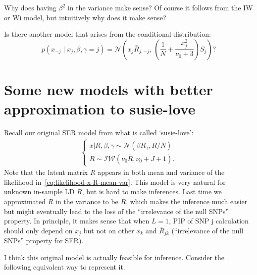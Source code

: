 \documentclass[11pt]{article}
\newcommand{\Normal}{\mathcal N}
\begin{document}
Why does having $\beta^2$ in the variance make sense? Of course it follows from the IW or Wi model, but intuitively why does it make sense?

Is there another model that arises from the conditional distribution:
\begin{equation}\label{eq:conditional-dist-Matthew}
p(x_{-j}\mid x_j, \beta, \gamma=j) = 
\Normal\left(
x_j \bar R_{j, -j} ,\,
\left(\frac{1}{N}+ \dfrac{x_j^2}{\nu_0 + 3}\right)S_j
\right)?
\end{equation}

\section{Some new models with better approximation to susie-love}
Recall our original SER model from what is called `susie-love':
\begin{align}\label{eq:likelihood-x-R-mean-var} 
\begin{cases}
x | R, \beta, \gamma \sim \mathcal{N}(\beta R_{\gamma}, R / N)\\
R \sim \mathcal{IW}(\nu_0 \bar R, \nu_0 + J + 1).
\end{cases}
\end{align}
Note that the latent matrix $R$ appears in both mean and variance of the likelihood in~\eqref{eq:likelihood-x-R-mean-var}. This model is very natural for unknown in-sample LD $R$, but is hard to make inferences. Last time we approximated $R$ in the variance to be $\bar R$, which makes the inference much easier but might eventually lead to the loss of the ``irrelevance of the null SNPs'' property. In principle, it makes sense that when $L = 1$, PIP of SNP j calculation should only depend on $x_j$ but not on other $x_k$ and $\bar R_{jk}$ (``irrelevance of the null SNPs'' property for SER).

I think this original model is actually feasible for inference. Consider the following equivalent way to represent it.
\end{document}
